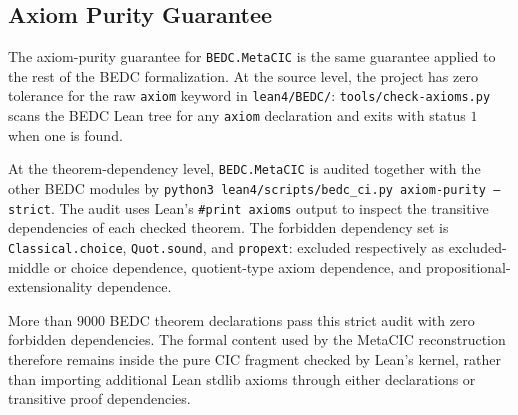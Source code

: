 \subsection{Axiom Purity Guarantee}\label{subsec:reconstruction-axiom-purity}

The axiom-purity guarantee for \texttt{BEDC.MetaCIC} is the same guarantee
applied to the rest of the BEDC formalization. At the source level, the
project has zero tolerance for the raw \texttt{axiom} keyword in
\texttt{lean4/BEDC/}: \texttt{tools/check-axioms.py} scans the BEDC Lean
tree for any \texttt{axiom} declaration and exits with status $1$ when one is
found.

At the theorem-dependency level, \texttt{BEDC.MetaCIC} is audited together
with the other BEDC modules by
\texttt{python3 lean4/scripts/bedc\_ci.py axiom-purity --strict}. The audit
uses Lean's \texttt{\#print axioms} output to inspect the transitive
dependencies of each checked theorem. The forbidden dependency set is
\texttt{Classical.choice}, \texttt{Quot.sound}, and \texttt{propext}: excluded
respectively as excluded-middle or choice dependence, quotient-type axiom
dependence, and propositional-extensionality dependence.

More than $9000$ BEDC theorem declarations pass this strict audit with zero
forbidden dependencies. The formal content used by the MetaCIC reconstruction
therefore remains inside the pure CIC fragment checked by Lean's kernel, rather
than importing additional Lean stdlib axioms through either declarations or
transitive proof dependencies.
